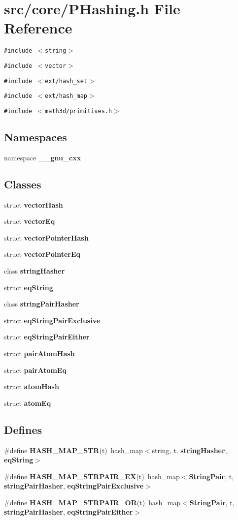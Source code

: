 \section{src/core/PHashing.h File Reference}
\label{PHashing_8h}


{\tt \#include $<$string$>$}\par
{\tt \#include $<$vector$>$}\par
{\tt \#include $<$ext/hash\_\-set$>$}\par
{\tt \#include $<$ext/hash\_\-map$>$}\par
{\tt \#include $<$math3d/primitives.h$>$}\par
\subsection*{Namespaces}
\begin{CompactItemize}
\item 
namespace {\bf \_\-\_\-gnu\_\-cxx}
\end{CompactItemize}
\subsection*{Classes}
\begin{CompactItemize}
\item 
struct {\bf vector\-Hash}
\item 
struct {\bf vector\-Eq}
\item 
struct {\bf vector\-Pointer\-Hash}
\item 
struct {\bf vector\-Pointer\-Eq}
\item 
class {\bf string\-Hasher}
\item 
struct {\bf eq\-String}
\item 
class {\bf string\-Pair\-Hasher}
\item 
struct {\bf eq\-String\-Pair\-Exclusive}
\item 
struct {\bf eq\-String\-Pair\-Either}
\item 
struct {\bf pair\-Atom\-Hash}
\item 
struct {\bf pair\-Atom\-Eq}
\item 
struct {\bf atom\-Hash}
\item 
struct {\bf atom\-Eq}
\end{CompactItemize}
\subsection*{Defines}
\begin{CompactItemize}
\item 
\#define {\bf HASH\_\-MAP\_\-STR}(t)~hash\_\-map$<$string, t, {\bf string\-Hasher}, {\bf eq\-String}$>$
\item 
\#define {\bf HASH\_\-MAP\_\-STRPAIR\_\-EX}(t)~hash\_\-map$<${\bf String\-Pair}, t, {\bf string\-Pair\-Hasher}, {\bf eq\-String\-Pair\-Exclusive}$>$
\item 
\#define {\bf HASH\_\-MAP\_\-STRPAIR\_\-OR}(t)~hash\_\-map$<${\bf String\-Pair}, t, {\bf string\-Pair\-Hasher}, {\bf eq\-String\-Pair\-Either}$>$
\end{CompactItemize}
